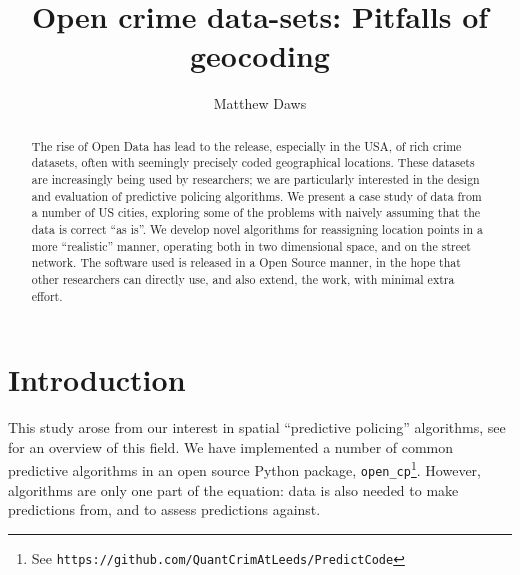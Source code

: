 \documentclass[twoside,a4paper,twocolumn,10pt]{article}
\theoremstyle{plain}
\theoremstyle{definition}
\begin{document}
\title{Open crime data-sets: Pitfalls of geocoding}
\author{Matthew Daws}
\maketitle

\begin{abstract}
The rise of Open Data has lead to the release, especially in the USA, of rich
crime datasets, often with seemingly precisely coded geographical locations.
These datasets are increasingly being used by researchers; we are particularly
interested in the design and evaluation of predictive policing algorithms.
We present a case study of data from a number of US cities, exploring some of
the problems with naively assuming that the data is correct ``as is''.  We develop
novel algorithms for reassigning location points in a more ``realistic'' manner,
operating both in two dimensional space, and on the street network.
The software used is released in a Open Source manner,
in the hope that other researchers can directly use, and also extend, the work,
with minimal extra effort.
\end{abstract}


\section{Introduction}

This study arose from our interest in spatial ``predictive policing'' algorithms,
see \cite{rand} for an overview of this field.  We have implemented a number of
common predictive algorithms in an open source Python package,
\texttt{open\_cp}\footnote{See \texttt{https://github.com/QuantCrimAtLeeds/PredictCode}}.
However, algorithms are only one part of the equation: data is also needed to make
predictions from, and to assess predictions against.
\end{document}
